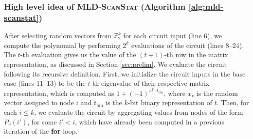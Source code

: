 \noindent
\subsubsection{High level idea of \textsc{MLD-ScanStat} (Algorithm \ref{alg:mld-scanstat})}
After selecting random vectors from $\mathbb{Z}_2^k$ for each circuit input (line 6), 
we compute the polynomial by performing $2^k$ evaluations of the circuit (lines 8--24). 
The $t$-{th} evaluation gives us the value of the $(t + 1)$-th row in the matrix 
representation, as discussed in Section \ref{sec:prelim}. We evaluate the circuit following its recursive definition. First, we initialize the circuit inputs in the base case (lines 11--13) 
to be the $t$-th eigenvalue of their respective matrix representation, which is computed 
as $1 + (-1)^{x_v^T\cdot t_{\text{bin}}}$, where $x_v$ is the random vector assigned to node 
$i$ and $t_{\text{bin}}$ is the $k$-bit binary representation of $t$. 
Then, for each $i \leq k$, we evaluate the circuit by aggregating values from nodes of the form $P_v(i')$, for some $i' < i$, which have already been computed in 
a previous iteration of the \textbf{for} loop. 

